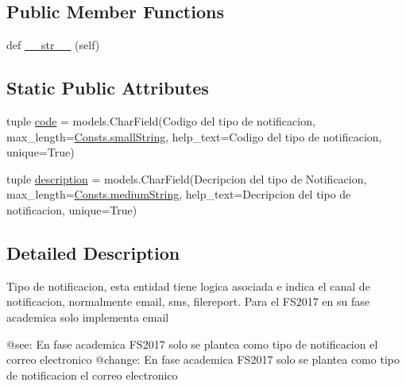 \subsection*{Public Member Functions}
\begin{DoxyCompactItemize}
\item 
def \hyperlink{class_ground_segment_1_1models_1_1_notification_1_1_notification_type_1_1_notification_type_ad2f14dde6f40dd6af27e3e413f120322}{\+\_\+\+\_\+str\+\_\+\+\_\+} (self)
\end{DoxyCompactItemize}
\subsection*{Static Public Attributes}
\begin{DoxyCompactItemize}
\item 
tuple \hyperlink{class_ground_segment_1_1models_1_1_notification_1_1_notification_type_1_1_notification_type_a21973c739cd9e93dd561e8fa71472152}{code} = models.\+Char\+Field(\textquotesingle{}Codigo del tipo de notificacion\textquotesingle{}, max\+\_\+length=\hyperlink{class_ground_segment_1_1models_1_1_consts_1_1_consts_a3788d24e86a0ffb03efc2a6bb1f88643}{Consts.\+small\+String}, help\+\_\+text=\textquotesingle{}Codigo del tipo de notificacion\textquotesingle{}, unique=True)
\item 
tuple \hyperlink{class_ground_segment_1_1models_1_1_notification_1_1_notification_type_1_1_notification_type_afc589eb485bea2c3fe042c2e38ca7e66}{description} = models.\+Char\+Field(\textquotesingle{}Decripcion del tipo de Notificacion\textquotesingle{}, max\+\_\+length=\hyperlink{class_ground_segment_1_1models_1_1_consts_1_1_consts_af293fcd2dc1b82ccc52722f90ac343ca}{Consts.\+medium\+String}, help\+\_\+text=\textquotesingle{}Decripcion del tipo de notificacion\textquotesingle{}, unique=True)
\end{DoxyCompactItemize}


\subsection{Detailed Description}
\begin{DoxyVerb}Tipo de notificacion, esta entidad tiene logica asociada e indica el canal de notificacion,
normalmente email, sms, filereport. Para el FS2017 en su fase academica solo implementa email

@see: En fase academica FS2017 solo se plantea como tipo de notificacion el correo electronico
@change: En fase academica FS2017 solo se plantea como tipo de notificacion el correo electronico
\end{DoxyVerb}
 

